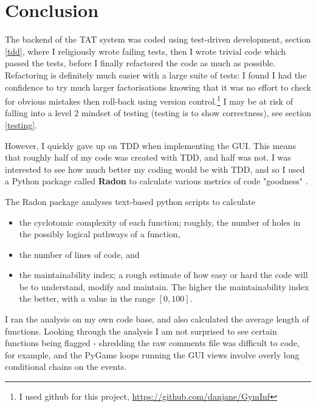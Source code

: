 \documentclass[10pt]{article}
\begin{document}
\section{Conclusion} \label{conclusion} 

The backend of the TAT system was coded using test-driven development, section \ref{tdd}, where I religiously wrote failing tests, then I wrote trivial code which passed the tests, before I finally refactored the code as much as possible. Refactoring is definitely much easier with a large suite of tests: I found I had the confidence to try much larger factorisations knowing that it was no effort to check for obvious mistakes then roll-back using version control.\footnote{I used github for this project, \url{https://github.com/danjane/GymInf}} I may be at risk of falling into a level 2 mindset of testing (testing is to show correctness), see section \ref{testing}.

However, I quickly gave up on TDD when implementing the GUI. This means that roughly half of my code was created with TDD, and half was not. I was interested to see how much better my coding would be with TDD, and so I used a Python package called \textbf{Radon} to calculate various metrics of code "goodness" \cite{Oman92}.

The Radon package analyses text-based python scripts to calculate
\begin{itemize}
\item the cyclotomic complexity of each function; roughly, the number of holes in the possibly logical pathways of a function,
\item the number of lines of code, and
\item the maintainability index; a rough estimate of how easy or hard the code will be to understand, modify and maintain\cite{Oman92}. The higher the maintainability index the better, with a value in the range $[0, 100]$.
\end{itemize}
I ran the analysis on my own code base, and also calculated the average length of functions. Looking through the analysis I am not surprised to see certain functions being flagged - shredding the raw comments file was difficult to code, for example, and the PyGame loops running the GUI views involve overly long conditional chains on the events.
\end{document}
